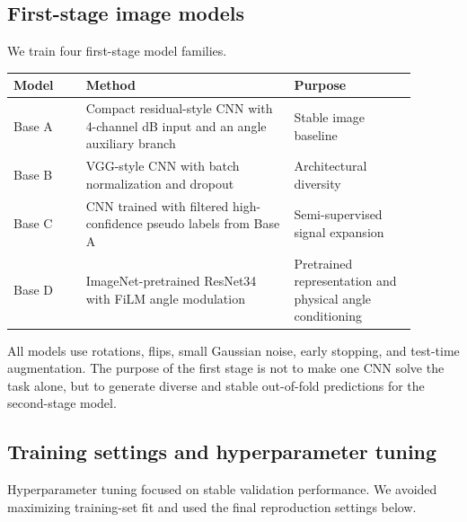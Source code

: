 \documentclass[11pt]{article}
\begin{document}
\subsection{First-stage image models}

We train four first-stage model families.

\begin{center}
\begin{tabular}{p{0.16\linewidth}p{0.46\linewidth}p{0.27\linewidth}}
\toprule
Model & Method & Purpose \\
\midrule
Base A & Compact residual-style CNN with 4-channel dB input and an angle auxiliary branch & Stable image baseline \\
Base B & VGG-style CNN with batch normalization and dropout & Architectural diversity \\
Base C & CNN trained with filtered high-confidence pseudo labels from Base A & Semi-supervised signal expansion \\
Base D & ImageNet-pretrained ResNet34 with FiLM angle modulation & Pretrained representation and physical angle conditioning \\
\bottomrule
\end{tabular}
\end{center}

All models use rotations, flips, small Gaussian noise, early stopping, and test-time augmentation. The purpose of the first stage is not to make one CNN solve the task alone, but to generate diverse and stable out-of-fold predictions for the second-stage model.

\subsection{Training settings and hyperparameter tuning}

Hyperparameter tuning focused on stable validation performance. We avoided maximizing training-set fit and used the final reproduction settings below.
\end{document}
